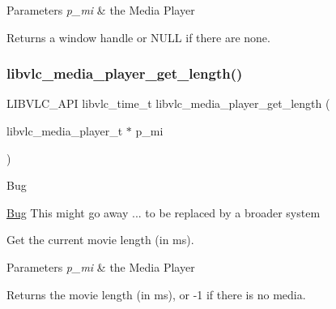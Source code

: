 \begin{DoxyParams}{Parameters}
{\em p\+\_\+mi} & the Media Player \\
\hline
\end{DoxyParams}
\begin{DoxyReturn}{Returns}
a window handle or N\+U\+LL if there are none. 
\end{DoxyReturn}
\mbox{\label{group__libvlc__media__player_ga057b0d82fb84f60ee24a6d76c1f135f3}} 
\subsubsection{\texorpdfstring{libvlc\+\_\+media\+\_\+player\+\_\+get\+\_\+length()}{libvlc\_media\_player\_get\_length()}}
{\footnotesize\ttfamily L\+I\+B\+V\+L\+C\+\_\+\+A\+PI libvlc\+\_\+time\+\_\+t libvlc\+\_\+media\+\_\+player\+\_\+get\+\_\+length (\begin{DoxyParamCaption}\item[{libvlc\+\_\+media\+\_\+player\+\_\+t $\ast$}]{p\+\_\+mi }\end{DoxyParamCaption})}

\begin{DoxyRefDesc}{Bug}
\item[\hyperlink{bug__bug000002}{Bug}]This might go away ... to be replaced by a broader system \end{DoxyRefDesc}
Get the current movie length (in ms).


\begin{DoxyParams}{Parameters}
{\em p\+\_\+mi} & the Media Player \\
\hline
\end{DoxyParams}
\begin{DoxyReturn}{Returns}
the movie length (in ms), or -\/1 if there is no media. 
\end{DoxyReturn}
\mbox{\label{group__libvlc__media__player_gacd3e2cbc0303a8ba8bdcb891da10876c}} 
